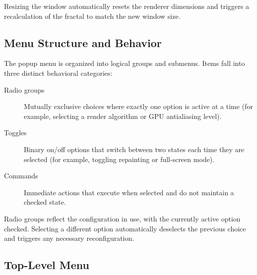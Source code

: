 Resizing the window automatically resets the renderer dimensions and triggers
a recalculation of the fractal to match the new window size.

\subsection{Menu Structure and Behavior}

The popup menu is organized into logical groups and submenus. Items fall into
three distinct behavioral categories:

\begin{description}
  \item[Radio groups] Mutually exclusive choices where exactly one option is
  active at a time (for example, selecting a render algorithm or GPU antialiasing level).
  \item[Toggles] Binary on/off options that switch between two states each time
  they are selected (for example, toggling repainting or full-screen mode).
  \item[Commands] Immediate actions that execute when selected and do not
  maintain a checked state.
\end{description}

Radio groups reflect the configuration in use, with the currently active option
checked. Selecting a different option automatically deselects the previous
choice and triggers any necessary reconfiguration.

\subsection{Top-Level Menu}

